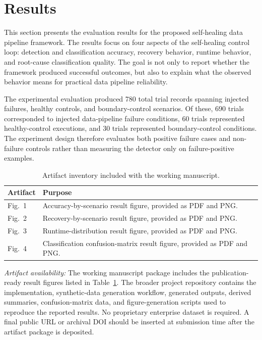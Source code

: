 \section{Results}
\label{sec:results}

This section presents the evaluation results for the proposed self-healing data pipeline framework. The results focus on four aspects of the self-healing control loop: detection and classification accuracy, recovery behavior, runtime behavior, and root-cause classification quality. The goal is not only to report whether the framework produced successful outcomes, but also to explain what the observed behavior means for practical data pipeline reliability.

The experimental evaluation produced 780 total trial records spanning injected failures, healthy controls, and boundary-control scenarios. Of these, 690 trials corresponded to injected data-pipeline failure conditions, 60 trials represented healthy-control executions, and 30 trials represented boundary-control conditions. The experiment design therefore evaluates both positive failure cases and non-failure controls rather than measuring the detector only on failure-positive examples.

\begin{table}[t]
\caption{Artifact inventory included with the working manuscript.}
\label{tab:artifact-availability}
\centering
\small
\begin{tabularx}{\columnwidth}{@{}lX@{}}
\toprule
Artifact & Purpose \\
\midrule
Fig.~1 & Accuracy-by-scenario result figure, provided as PDF and PNG. \\
Fig.~2 & Recovery-by-scenario result figure, provided as PDF and PNG. \\
Fig.~3 & Runtime-distribution result figure, provided as PDF and PNG. \\
Fig.~4 & Classification confusion-matrix result figure, provided as PDF and PNG. \\
\bottomrule
\end{tabularx}
\end{table}

\noindent\textit{Artifact availability:} The working manuscript package includes the publication-ready result figures listed in Table~\ref{tab:artifact-availability}. The broader project repository contains the implementation, synthetic-data generation workflow, generated outputs, derived summaries, confusion-matrix data, and figure-generation scripts used to reproduce the reported results. No proprietary enterprise dataset is required. A final public URL or archival DOI should be inserted at submission time after the artifact package is deposited.

